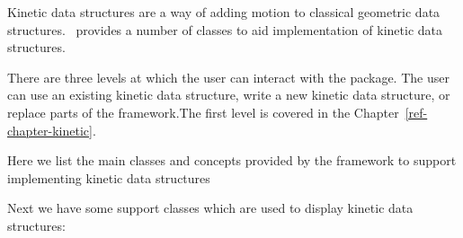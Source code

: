 


Kinetic data structures are a way of adding motion to classical
geometric data structures. \cgal\ provides a number of classes to aid
implementation of kinetic data structures.

There are three levels at which the user can interact with the
package. The user can use an existing kinetic data structure, write a
new kinetic data structure, or replace parts of the framework.The
first level is covered in the Chapter~\ref{ref-chapter-kinetic}.






Here we list the main classes and concepts provided by the framework to support implementing kinetic data structures












Next we have some support classes which are used to display kinetic data structures:







